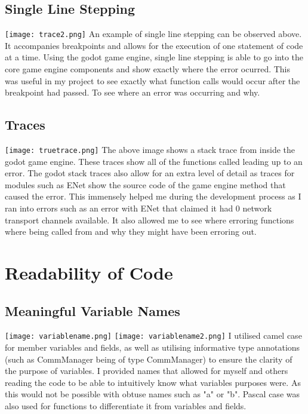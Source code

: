 \documentclass[12pt, DIV=calc]{scrartcl}
\begin{document}
\subsection{Single Line Stepping}
\texttt{[image: trace2.png]}
An example of single line stepping can be observed above. It accompanies breakpoints and allows for the execution of one statement of code at a time. Using the godot game engine, single line stepping is able to go into the core game engine components and show exactly where the error ocurred. This was useful in my project to see exactly what function calls would occur after the breakpoint had passed. To see where an error was occurring and why.

\subsection{Traces}
\texttt{[image: truetrace.png]}
The above image shows a stack trace from inside the godot game engine. These traces show all of the functions called leading up to an error. The godot stack traces also allow for an extra level of detail as traces for modules such as ENet show the source code of the game engine method that caused the error. This immensely helped me during the development process as I ran into errors such as an error with ENet that claimed it had 0 network transport channels available. It also allowed me to see where erroring functions where being called from and why they might have been erroring out.







\clearpage
\section{Readability of Code}
\subsection{Meaningful Variable Names} 
\texttt{[image: variablename.png]}
\texttt{[image: variablename2.png]}
I utilised camel case for member variables and fields, as well as utilising informative type annotations (such as CommManager being of type CommManager) to ensure the clarity of the purpose of variables. I provided names that allowed for myself and others reading the code to be able to intuitively know what variables purposes were. As this would not be possible with obtuse names such as "a" or "b". Pascal case was also used for functions to differentiate it from variables and fields. \\
\end{document}
